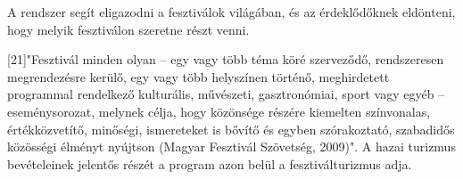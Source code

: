 

A rendszer segít eligazodni a fesztiválok világában, és az érdeklődőknek eldönteni, hogy melyik fesztiválon szeretne részt venni.

[21]"Fesztivál minden olyan – egy vagy több téma köré szerveződő, rendszeresen megrendezésre kerülő, egy vagy több helyszínen történő, meghirdetett programmal rendelkező kulturális, művészeti, gasztronómiai, sport vagy egyéb – eseménysorozat, melynek célja, hogy közönsége részére kiemelten színvonalas, értékközvetítő, minőségi, ismereteket is bővítő és egyben szórakoztató, szabadidős közösségi élményt nyújtson (Magyar Fesztivál Szövetség, 2009)".
A hazai turizmus bevételeinek jelentős részét a program azon belül a fesztiválturizmus adja.